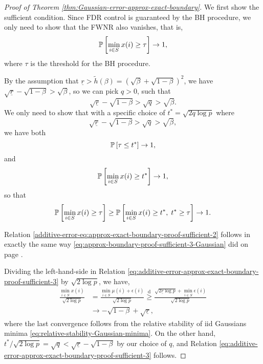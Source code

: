 \begin{proof}[Proof of Theorem \ref{thm:Gaussian-error-approx-exact-boundary}]
We first show the sufficient condition.
Since FDR control is guaranteed by the BH procedure, we only need to show that the FWNR also vanishes, that is,
\begin{equation} \label{eq:approx-exact-boundary-proof-sufficient-1-Gaussian}
    \P\left[\min_{i\in S}x(i) \ge \tau\right] \to 1,
\end{equation}
where $\tau$ is the threshold for the BH procedure.

By the assumption that $\underline{r}>\widetilde{h}(\beta)=(\sqrt{\beta}+\sqrt{1-\beta})^2$, we have $\sqrt{\underline{r}}-\sqrt{1-\beta}>\sqrt{\beta}$, so we can pick $q>0$, such that 
\begin{equation} \label{eq:approx-exact-boundary-proof-sufficient-2-Gaussian}
\sqrt{\underline{r}}-\sqrt{1-\beta}>\sqrt{q}>\sqrt{\beta}.
\end{equation}
We only need to show that with a specific choice of $t^*=\sqrt{2q\log{p}}$ where
\begin{equation} \label{eq:additive-error-approx-exact-boundary-proof-sufficient-1}
\sqrt{\underline{r}}-\sqrt{1-\beta}>\sqrt{q}>\sqrt{\beta},
\end{equation}
we have both
\begin{equation} \label{additive-error-eq:approx-exact-boundary-proof-sufficient-2}
\P\left[\tau\le t^*\right]\to 1,
\end{equation}
and 
\begin{equation} \label{eq:additive-error-approx-exact-boundary-proof-sufficient-3}
    \P\left[\min_{i\in S}x(i) \ge t^* \right] \to 1,
\end{equation}
so that 
\begin{equation*} 
    \P\left[\min_{i\in S}x(i) \ge \tau\right] \ge 
    \P\left[\min_{i\in S}x(i) \ge t^*,\; t^* \ge \tau\right] \to 1.
\end{equation*}

Relation \eqref{additive-error-eq:approx-exact-boundary-proof-sufficient-2} follows in exactly the same way \eqref{eq:approx-boundary-proof-sufficient-3-Gaussian} did on page  \pageref{eq:approx-boundary-proof-sufficient-3-Gaussian}.

Dividing the left-hand-side in Relation \eqref{eq:additive-error-approx-exact-boundary-proof-sufficient-3} by $\sqrt{2\log{p}}$, we have,
\begin{align*}
    \frac{\min_{i\in S}x(i)}{\sqrt{2\log{p}}} 
    &= \frac{\min_{i\in S}\mu(i)+\epsilon(i)}{\sqrt{2\log{p}}} 
    \stackrel{\mathrm{d}}{\ge} \frac{\sqrt{2\underline{r}\log{p}} + \min_{i\in S}\epsilon(i)}{\sqrt{2\log{p}}} \\
    &\to -\sqrt{1-\beta} + \sqrt{\underline{r}},
\end{align*}
where the last convergence follows from the relative stability of iid Gaussians minima \eqref{eq:relative-stability-Gaussian-minima}. 
On the other hand, ${t^*}/{\sqrt{2\log{p}}}=\sqrt{q}<\sqrt{\underline{r}}-\sqrt{1-\beta}$ by our choice of ${q}$, and Relation \eqref{eq:additive-error-approx-exact-boundary-proof-sufficient-3} follows.



\end{proof}
